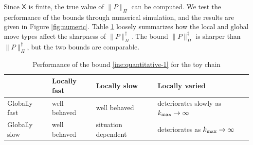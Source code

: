 \documentclass[12pt]{article}
\newcommand{\X}{\mathsf{X}}
\begin{document}
Since $\X$ is finite, the true value of $\|P\|_{\Pi}$ can be computed.
We test the performance of the bounds through numerical simulation, and the results are given in Figure \ref{fig:numeric}.
Table \ref{tab:bound} loosely summarizes how the local and global move types affect the sharpness of $\|P\|_{\Pi}^{\dagger}$.
The bound $\|P\|_{\Pi}^{\ddagger}$ is sharper than $\|P\|_{\Pi}^{\dagger}$, but the two bounds are comparable.


\begin{table}
	\caption{Performance of the bound \eqref{ine:quantitative-1} for the toy chain} \label{tab:bound}
	\begin{center}
		\begin{tabular}{l|lll}
			\hline
			& Locally fast & Locally slow & Locally varied \\
			\hline
			Globally fast & well behaved & well behaved & deteriorates slowly as $k_{\scriptsize\mbox{max}} \to \infty$ \\
			Globally slow & well behaved & situation dependent & deteriorates as $k_{\scriptsize\mbox{max}} \to \infty$ \\
			\hline
		\end{tabular}
	\end{center}
\end{table}
\end{document}
